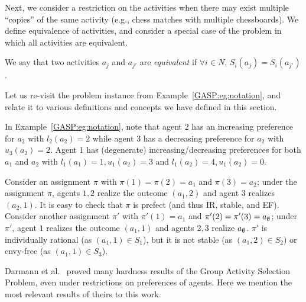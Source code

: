 Next, we consider a restriction on the activities when there may exist multiple ``copies'' of the same activity (e.g., chess matches with multiple chessboards). We define equivalence of activities, and consider a special case of the problem in which all activities are equivalent. 
\begin{definition}
	We say that two activities $a_j$ and $a_{j'}$ are {\em equivalent} if $\forall i \in N$, $S_i(a_j) = S_i(a_{j'})$. 
\end{definition}

Let us re-visit the problem instance from Example~\ref{GASP:eg:notation}, and relate it to various definitions and concepts we have defined in this section. 
\begin{example}
In Example~\ref{GASP:eg:notation}, note that agent $2$ has an increasing preference for $a_2$ with $l_2(a_2) = 2$ while agent $3$ has a decreasing preference for $a_2$ with $u_3(a_2) = 2$. Agent $1$ has (degenerate) increasing/decreasing preferences for both $a_1$ and $a_2$ with $l_1(a_1)=1, u_1(a_2) = 3$ and $l_1(a_2)=4,u_1(a_2)=0$.

Consider an assignment $\pi$ with $\pi(1) = \pi(2) = a_1$ and $\pi(3) = a_2$; under the assignment $\pi$, agents $1,2$ realize the outcome $(a_1, 2)$ and agent $3$ realizes $(a_2, 1)$. It is easy to check that $\pi$ is prefect (and thus IR, stable, and EF). Consider another assignment $\pi'$ with $\pi'(1) = a_1$ and $\pi'(2)=\pi'(3)=a_{\emptyset}$; under $\pi'$, agent $1$ realizes the outcome $(a_1, 1)$ and agents $2,3$ realize $a_{\emptyset}$. $\pi'$ is individually rational (as $(a_1,1)\in S_1$), but it is not stable (as $(a_1,2)\in S_2$) or envy-free (as $(a_1,1) \in S_3$).
\end{example}

Darmann et al.~\cite{GASP12WINE} proved many hardness results of the Group Activity Selection Problem, even under restrictions on preferences of agents.
Here we mention the most relevant results of theirs to this work.

